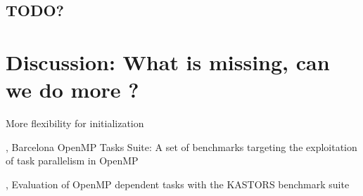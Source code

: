 \subsection{TODO?}

\section{Discussion: What is missing, can we do more ?}
More flexibility for initialization


%

\cite{Duran2009}, Barcelona OpenMP Tasks Suite: A set of benchmarks targeting the exploitation of task parallelism in OpenMP

\cite{Virouleau2014}, Evaluation of OpenMP dependent tasks with the KASTORS benchmark suite
